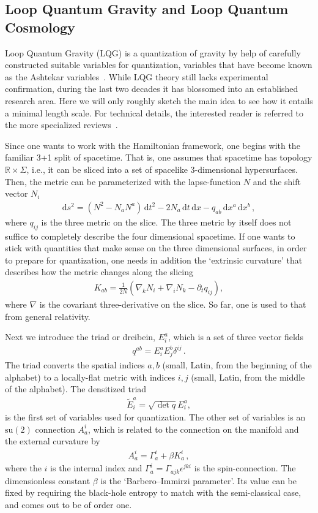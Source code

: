 \documentclass{article}
\def\beqn{\begin{eqnarray}}
\def\eeqn{\end{eqnarray}}
\begin{document}
\subsection{Loop Quantum Gravity and Loop Quantum Cosmology} 
\label{loop}

Loop Quantum Gravity ({\sc LQG}) is a quantization of gravity by help of carefully constructed suitable
variables for quantization, variables that have become known as the Ashtekar variables~\cite{AA}.   
While {\sc LQG} theory still lacks experimental confirmation, during the last
two decades it has blossomed into an established research area. Here we will only roughly sketch
the main idea to see how it entails a minimal length scale. For technical details, the
interested reader is referred to the more specialized reviews~\cite{Ashtekar:2004eh,Thiemann:2006cf,Thiemann:2007zz,Mercuri:2010xz,Jorge}.

Since one wants to work with the Hamiltonian framework, one begins with the familiar 3+1 split of 
spacetime. That is, one assumes that spacetime has topology
${\mathbb{R}} \times \Sigma$, i.e., it can be sliced into
a set of spacelike 3-dimensional hypersurfaces. Then, the metric can be parameterized with the
lapse-function $N$ and the shift vector $N_i$
\beqn
\mathrm{d}s^2 = (N^2 - N_a N^a) \, \mathrm{d}t^2 - 2 N_a \, \mathrm{d}t \,
\mathrm{d}x - q_{ab} \, \mathrm{d}x^a \, \mathrm{d}x^b \,,
\eeqn
where $q_{ij}$ is the three metric on the slice. The three metric by itself does not suffice to completely 
describe the four dimensional spacetime. If one wants to stick with quantities that make sense on the
three dimensional surfaces, in order to prepare for quantization, one needs in addition 
the `extrinsic curvature' that describes how
the metric changes along the slicing
\beqn
K_{ab} = \frac{1}{2N} \left(\nabla_k N_i + \nabla_i N_k - \partial_t q_{ij} \right) , 
\eeqn
where $\nabla$ is the covariant three-derivative on the slice. So far, one is
used to that from general relativity. 

Next we introduce the triad or dreibein, $E_i^a$, which is a set of three vector fields
\beqn
q^{ab} = E^a_i E^b_j \delta^{ij} \,.
\eeqn
The triad converts the spatial indices $a,b$ (small, Latin, from the beginning of the alphabet)
to a locally-flat metric with indices $i,j$ (small, Latin, from the middle of the alphabet). The
densitized triad
\beqn
\tilde E_i^a = \sqrt{\det q} E_i^a,
\eeqn
is the first set of variables used for quantization. The other set of variables is an $\mathrm{su}(2)$ 
connection $A_a^i$, which is related to the connection on the manifold and the external curvature by
\beqn
A^i_a = \Gamma^i_a + \beta K^i_a \,,
\eeqn
where the $i$ is the internal index and $\Gamma^i_a = \Gamma_{ajk}\epsilon^{jki}$ is the spin-connection. 
The dimensionless constant $\beta$ is the `Barbero--Immirzi parameter'. Its value can be fixed by requiring the
black-hole entropy to match with the semi-classical case, and comes out to be of order one. 
\end{document}
